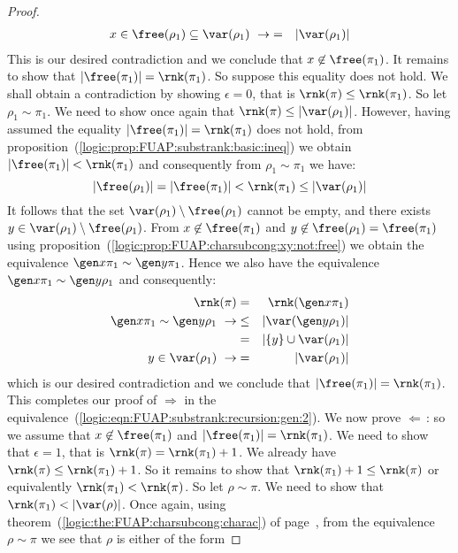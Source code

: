 \begin{proof}
\begin{eqnarray*}
    x\in\free(\rho_{1})\subseteq\var(\rho_{1})\ \rightarrow
    &=&|\var(\rho_{1})|\\
    \end{eqnarray*}
This is our desired contradiction and we conclude that
$x\not\in\free(\pi_{1})$. It remains to show that
$|\free(\pi_{1})|=\rnk(\pi_{1})$. So suppose this equality does not
hold. We shall obtain a contradiction by showing $\epsilon=0$, that
is $\rnk(\pi)\leq\rnk(\pi_{1})$. So let $\rho_{1}\sim\pi_{1}$. We
need to show once again that $\rnk(\pi)\leq|\var(\rho_{1})|$.
However, having assumed the equality
$|\free(\pi_{1})|=\rnk(\pi_{1})$ does not hold, from
proposition~(\ref{logic:prop:FUAP:substrank:basic:ineq}) we obtain
$|\free(\pi_{1})|<\rnk(\pi_{1})$ and consequently from
$\rho_{1}\sim\pi_{1}$ we have:
    \[
    |\free(\rho_{1})|=|\free(\pi_{1})|
    <\rnk(\pi_{1})
    \leq|\var(\rho_{1})|
    \]
It follows that the set $\var(\rho_{1})\setminus\free(\rho_{1})$
cannot be empty, and there exists
$y\in\var(\rho_{1})\setminus\free(\rho_{1})$. From
$x\not\in\free(\pi_{1})$ and
$y\not\in\free(\rho_{1})=\free(\pi_{1})$ using
proposition~(\ref{logic:prop:FUAP:charsubcong:xy:not:free}) we
obtain the equivalence $\gen x\pi_{1}\sim\gen y\pi_{1}$. Hence we
also have the equivalence $\gen x\pi_{1}\sim\gen y\rho_{1}$ and
consequently:
    \begin{eqnarray*}
    \rnk(\pi)&=&\rnk(\gen x\pi_{1})\\
        \gen x\pi_{1}\sim\gen y\rho_{1}\ \rightarrow
        &\leq&|\var(\gen y\rho_{1})|\\
        &=&|\{y\}\cup\var(\rho_{1})|\\
        y\in\var(\rho_{1})\ \rightarrow
        &=&|\var(\rho_{1})|
    \end{eqnarray*}
which is our desired contradiction and we conclude that
$|\free(\pi_{1})|=\rnk(\pi_{1})$. This completes our proof of
$\Rightarrow$ in the
equivalence~(\ref{logic:eqn:FUAP:substrank:recursion:gen:2}). We now
prove $\Leftarrow$\,: so we assume that $x\not\in\free(\pi_{1})$ and
$|\free(\pi_{1})|=\rnk(\pi_{1})$. We need to show that $\epsilon=1$,
that is $\rnk(\pi)=\rnk(\pi_{1})+1$. We already have
$\rnk(\pi)\leq\rnk(\pi_{1})+1$. So it remains to show that
$\rnk(\pi_{1})+1\leq\rnk(\pi)$ or equivalently
$\rnk(\pi_{1})<\rnk(\pi)$. So let $\rho\sim\pi$. We need to show
that $\rnk(\pi_{1})<|\var(\rho)|$. Once again, using
theorem~(\ref{logic:the:FUAP:charsubcong:charac}) of
page~\pageref{logic:the:FUAP:charsubcong:charac}, from the
equivalence $\rho\sim\pi$ we see that $\rho$ is either of the form

\end{proof}
